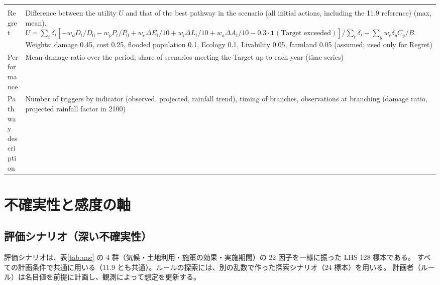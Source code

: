 \documentclass[a4paper,10pt]{ltjsarticle}
\begin{document}
\begin{table}[tbp]
\begin{tabularx}{\textwidth}{@{}>{\raggedright\arraybackslash}p{34mm} L@{}}
\midrule
{}\\
Regret & Difference between the utility $U$ and that of the best pathway in the scenario (all initial actions, including the 11.9 reference) (max, mean).
  $U = \sum_t \delta_t[-w_d D_t/D_0 - w_p P_t/P_0 + w_e \Delta E_t/10 + w_l \Delta L_t/10 + w_a \Delta A_t/10 - 0.3\cdot\mathbf{1}(\text{Target exceeded})]/\sum_t\delta_t - \sum_y w_c\delta_y C_y/B$.
  Weights: damage 0.45, cost 0.25, flooded population 0.1, Ecology 0.1, Livability 0.05, farmland 0.05 (assumed; used only for Regret)\\
Performance & Mean damage ratio over the period; share of scenarios meeting the Target up to each year (time series)\\
Pathway description & Number of triggers by indicator (observed, projected, rainfall trend), timing of branches, observations at branching (damage ratio, projected rainfall factor in 2100)\\
\bottomrule
\end{tabularx}
\end{table}

\section{不確実性と感度の軸}
\label{sec:uncertainty}

\subsection{評価シナリオ（深い不確実性）}
評価シナリオは、表\ref{tab:unc} の 4 群（気候・土地利用・施策の効果・実施期間）の 22 因子を一様に振った LHS\cite{mckay1979} 128 標本である。
すべての計画条件で共通に用いる（11.9 とも共通）。ルールの探索には、別の乱数で作った探索シナリオ（24 標本）を用いる。
計画者（ルール）は名目値を前提に計画し、観測によって想定を更新する。
\end{document}
